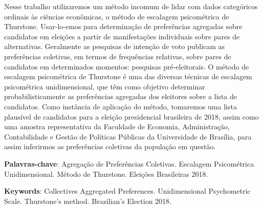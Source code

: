 \documentclass[
	article,			%
	12pt,				%
	oneside,			%
	a4paper,			%
	english,			%
	brazil,				%
	]{abntex2}
\begin{document}
\frenchspacing 


%
%
\maketitle
\begin{resumoumacoluna}
 Nesse trabalho utilizaremos um método incomum de lidar com dados categóricos ordinais às ciências econômicas, o método de escalagem psicométrica de Thurstone. Usar-lo-emos para determinação de preferências agregadas sobre candidatos em eleições a partir de manifestações individuais sobre pares de alternativas. Geralmente as pesquisas de intenção de voto publicam as preferências coletivas, em termos de frequências relativas, sobre pares de candidatos em determinados momentos: pesquisas pré-eleitorais. O método de escalagem psicométrica de Thurstone é uma das diversas técnicas de escalagem psicométrica unidimensional, que têm como objetivo determinar probabilisticamente as preferências agregadas dos eleitores sobre a lista de candidatos. Como instância de aplicação do método, tomaremos uma lista plausível de candidatos para a eleição presidencial brasileira de 2018, assim como uma amostra representativa da Faculdade de Economia, Administração, Contabilidade e Gestão de Políticas Públicas da Universidade de Brasília, para assim inferirmos as preferências coletivas da população em questão.
 
 \vspace{\onelineskip}
 
 \noindent
 \textbf{Palavras-chave}: Agregação de Preferências Coletivas. Escalagem Psicométrica Unidimensional. Método de Thurstone. Eleições Brasileiras 2018.
 
 \vspace{\onelineskip}
 
 \noindent
 \textbf{Keywords}: Collectives Aggregated Preferences. Unidimensional Psychometric Scale. Thurstone's method. Brazilian's Election 2018.
 
 \end{resumoumacoluna}
\end{document}
